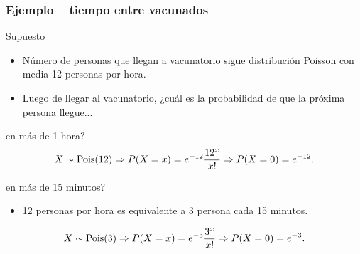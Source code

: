 \documentclass[table]{beamer}
\begin{document}
\begin{frame}
    \frametitle{Ejemplo -- tiempo entre vacunados}
    \begin{block}{Supuesto}
        \begin{itemize}
            \item Número de personas que llegan a vacunatorio sigue distribución Poisson con media 12 personas por hora.
            \item Luego de llegar al vacunatorio, ¿cuál es la probabilidad de que la próxima persona llegue...
        \end{itemize}
    \end{block}
    \begin{block}{en más de 1 hora?}
        \begin{equation*}
            X \sim \poisson{12} \Rightarrow \prob{X = x} = e^{- 12} \frac{12^{x}}{x!}
            \Rightarrow \prob{X = 0} = e^{- 12} .
        \end{equation*}
    \end{block}
    \begin{block}{en más de 15 minutos?}
        \begin{itemize}
            \item 12 personas por hora es equivalente a 3 persona cada 15 minutos.
        \end{itemize}
        \begin{equation*}
            X \sim \poisson{3} \Rightarrow \prob{X = x} = e^{- 3} \frac{3^{x}}{x!}
            \Rightarrow \prob{X = 0} = e^{- 3} .
        \end{equation*}
    \end{block}
\end{frame}
\end{document}
